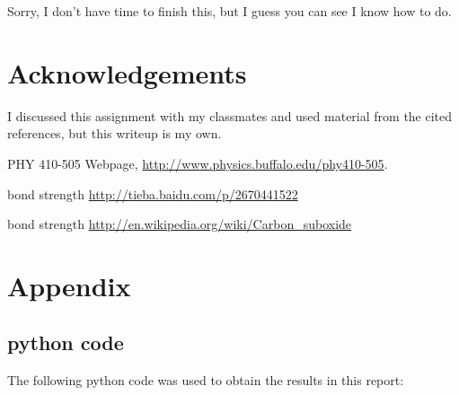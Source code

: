 \documentclass[11pt,letterpaper]{article}
\begin{document}
Sorry, I don't have time to finish this, but I guess you can see I know how to do.
\newpage
\section*{Acknowledgements}

I discussed this assignment with my classmates and used material from the
cited references, but this writeup is my own.

\begin{thebibliography}{9}


PHY 410-505 Webpage, \url{http://www.physics.buffalo.edu/phy410-505}.



bond strength
\url{http://tieba.baidu.com/p/2670441522}

bond strength
\url{http://en.wikipedia.org/wiki/Carbon_suboxide}

\end{thebibliography}

\newpage
\appendix
\section{Appendix}

\subsection{python code}

The following python code was used to obtain the results in this report:




\end{document}
